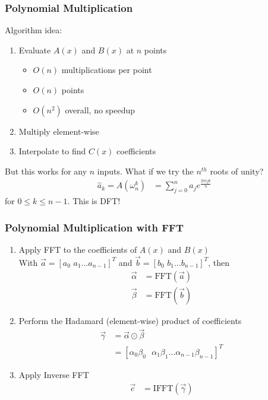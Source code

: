 \documentclass[
	11pt, %
]{beamer}
\begin{document}
\begin{frame}
    \frametitle{Polynomial Multiplication}
    Algorithm idea:
    \begin{enumerate}
        \item Evaluate $A(x)$ and $B(x)$ at $n$ points
              \begin{itemize}
                  \item $O(n)$ multiplications per point
                  \item $O(n)$ points
                  \item $O(n^2)$ overall, no speedup
              \end{itemize}
        \item Multiply element-wise
        \item Interpolate to find $C(x)$ coefficients
    \end{enumerate}
    \bigskip
    But this works for any $n$ inputs. What if we try the $n^{th}$ roots of unity?
    \begin{align*}
        \hat{a}_k = A(\omega_n^k) & = \sum_{j=0}^n a_j e^{\frac{2\pi ijk}{n}}
    \end{align*}
    for $0 \leq k \leq n-1$. This is \alert{DFT}!
\end{frame}


\begin{frame}
    \frametitle{Polynomial Multiplication with FFT}
    \begin{enumerate}
        \item Apply FFT to the coefficients of $A(x)$ and $B(x)$ \\
              With $\vec{a} = [a_0\,\,a_1\dots a_{n-1}]^T$ and $\vec{b} = [b_0\,\,b_1\dots b_{n-1}]^T$, then
              \begin{align*}
                  \vec{\alpha} & = \text{FFT}(\vec{a}) \tag*{$O(n\log n)$} \\
                  \vec{\beta}  & = \text{FFT}(\vec{b}) \tag*{$O(n\log n)$}
              \end{align*}
        \item Perform the Hadamard (element-wise) product of coefficients
              \begin{align*}
                  \vec{\gamma} & = \vec{\alpha} \odot \vec{\beta}                                                       \\
                               & = [\alpha_0\beta_0\,\,\,\,\alpha_1\beta_1\dots\alpha_{n-1}\beta_{n-1}]^T \tag*{$O(n)$}
              \end{align*}
        \item Apply Inverse FFT
              \begin{align*}
                  \vec{c} & = \text{IFFT}(\vec{\gamma}) \tag*{$O(n\log n)$}
              \end{align*}
    \end{enumerate}
\end{frame}
\end{document}
